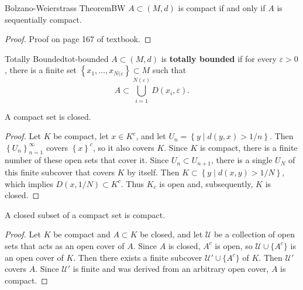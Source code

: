 \documentclass[10pt]{report}
\begin{document}
\begin{thrm}{Bolzano-Weierstrass Theorem}{BW}
	$A \subset (M,d)$ is compact if and only if $A$ is sequentially compact.
\end{thrm}
\begin{proof}
	{\color{red}Proof on page 167 of textbook.} 
\end{proof}


\begin{defn}{Totally Bounded}{tot-bounded}
	$A \subset (M,d)$ is \textbf{totally bounded} if for every $\varepsilon>0$, there is a finite set $\left\{ x_1,\dots,x_{N(\varepsilon} \right\} \subset M$ such that \[A \subset \bigcup_{i=1}^{N(\varepsilon)} D(x_i,\varepsilon).\]
\end{defn}

\begin{prop}
	A compact set is closed.
\end{prop}
\begin{proof}
	Let $K$ be compact, let $x \in K^c$, and let $U_n = \left\{ y \;|\; d(y,x) > 1/n \right\}$. Then $\left\{ U_n \right\}_{n=1}^\infty$ covers $\left\{ x \right\}^c$, so it also covers $K$. Since $K$ is compact, there is a finite number of these open sets that cover it. Since $U_n \subset U_{n+1}$, there is a single $U_N$ of this finite subcover that covers $K$ by itself. Then $K \subset \left\{ y \;|\; d(x,y) > 1/N \right\}$, which implies $D(x,1/N) \subset K^c$. Thus $K_c$ is open and, subsequently, $K$ is closed.
\end{proof}

\begin{prop}
	A closed subset of a compact set is compact.
\end{prop}
\begin{proof}
	Let $K$ be compact and $A \subset K$ be closed, and let $\mathcal{U}$ be a collection of open sets that acts as an open cover of $A$. Since $A$ is closed, $A^c$ is open, so $\mathcal{U} \cup \{A^c\}$ is an open cover of $K$. Then there exists a finite subcover $\mathcal{U}' \cup \{A^c\}$ of $K$. Then $\mathcal{U}'$ covers $A$. Since $\mathcal{U}'$ is finite and was derived from an arbitrary open cover, $A$ is compact.
\end{proof}
\end{document}
